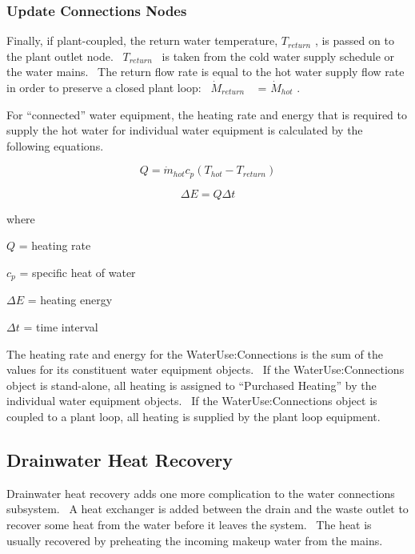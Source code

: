 \subsubsection{Update Connections Nodes}\label{update-connections-nodes}

Finally, if plant-coupled, the return water temperature, \({T_{return}}\) , is passed on to the plant outlet node.~ \({T_{return}}\) ~is taken from the cold water supply schedule or the water mains.~ The return flow rate is equal to the hot water supply flow rate in order to preserve a closed plant loop:~ \({\dot M_{return}}\) ~ = \({\dot M_{hot}}\) .

For ``connected'' water equipment, the heating rate and energy that is required to supply the hot water for individual water equipment is calculated by the following equations.

\begin{equation}
Q = {\dot m_{hot}}{c_p}\left( {{T_{hot}} - {T_{return}}} \right)
\end{equation}

\begin{equation}
\Delta E = Q\Delta t
\end{equation}

where

\(Q\) = heating rate

\({c_p}\) = specific heat of water

\(\Delta E\) = heating energy

\(\Delta t\) = time interval

The heating rate and energy for the WaterUse:Connections is the sum of the values for its constituent water equipment objects.~ If the WaterUse:Connections object is stand-alone, all heating is assigned to ``Purchased Heating'' by the individual water equipment objects.~ If the WaterUse:Connections object is coupled to a plant loop, all heating is supplied by the plant loop equipment.

\subsection{Drainwater Heat Recovery}\label{drainwater-heat-recovery}

Drainwater heat recovery adds one more complication to the water connections subsystem.~ A heat exchanger is added between the drain and the waste outlet to recover some heat from the water before it leaves the system.~ The heat is usually recovered by preheating the incoming makeup water from the mains.

